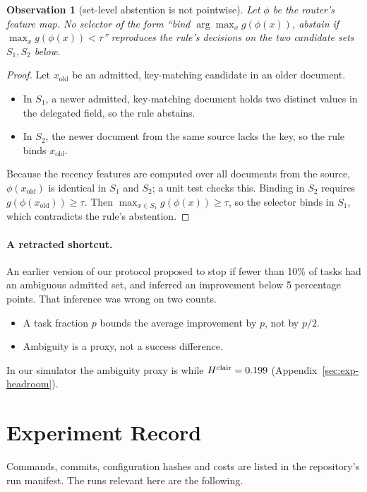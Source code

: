 \documentclass{article}
\newtheorem{observation}{Observation}
\begin{document}
\begin{observation}[set-level abstention is not pointwise]
\label{obs:set}
Let $\phi$ be the router's feature map. No selector of the form ``bind
$\arg\max_x g(\phi(x))$, abstain if $\max_x g(\phi(x))<\tau$'' reproduces
the rule's decisions on the two candidate sets $S_1,S_2$ below.
\end{observation}
\begin{proof}
Let $x_{\mathrm{old}}$ be an admitted, key-matching candidate in an older
document.
\begin{itemize}
\item In $S_1$, a newer admitted, key-matching document holds two distinct
values in the delegated field, so the rule abstains.
\item In $S_2$, the newer document from the same source lacks the key, so the
rule binds $x_{\mathrm{old}}$.
\end{itemize}
Because the recency features are computed over all documents from the
source, $\phi(x_{\mathrm{old}})$ is identical in $S_1$ and $S_2$; a unit test
checks this. Binding in $S_2$ requires $g(\phi(x_{\mathrm{old}}))\ge\tau$.
Then $\max_{x\in S_1}g(\phi(x))\ge\tau$, so the selector binds in $S_1$,
which contradicts the rule's abstention.
\end{proof}

\paragraph{A retracted shortcut.}
An earlier version of our protocol proposed to stop if fewer than 10\% of
tasks had an ambiguous admitted set, and inferred an improvement below 5
percentage points. That inference was wrong on two counts.
\begin{itemize}
\item A task fraction $p$ bounds the average improvement by $p$, not by
$p/2$.
\item Ambiguity is a proxy, not a success difference.
\end{itemize}
In our simulator the ambiguity proxy is \ProxySim{} while
$H^{\mathrm{clair}}=0.199$ (Appendix~\ref{sec:exp-headroom}).

\section{Experiment Record}
\label{app:record}
Commands, commits, configuration hashes and costs are listed in the
repository's run manifest. The runs relevant here are the following.
\end{document}
